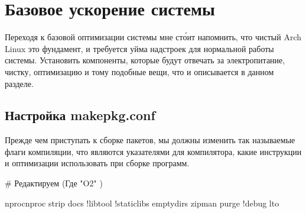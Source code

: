 \documentclass[letterpaper,10pt,russian,openany]{sphinxmanual}
\begin{document}
\sphinxstepscope


\chapter{Базовое ускорение системы}
\label{\detokenize{source/generic-system-acceleration:generic-system-acceleration}}\label{\detokenize{source/generic-system-acceleration:id1}}\label{\detokenize{source/generic-system-acceleration::doc}}
\sphinxAtStartPar
Переходя к базовой оптимизации системы мне сто́ит напомнить, что чистый Arch Linux \sphinxhyphen{} это фундамент, и требуется уйма надстроек для нормальной работы системы.
Установить компоненты, которые будут отвечать за электропитание, чистку, оптимизацию и тому подобные вещи, что и описывается в данном разделе.

\ignorespaces 

\section{Настройка makepkg.conf}
\label{\detokenize{source/generic-system-acceleration:makepkg-conf}}\label{\detokenize{source/generic-system-acceleration:index-0}}\label{\detokenize{source/generic-system-acceleration:id2}}
\sphinxAtStartPar
Прежде чем приступать к сборке пакетов, мы должны изменить так называемые флаги компиляции,
что являются указателями для компилятора, какие инструкции и оптимизации использовать при сборке программ.

\sphinxAtStartPar
{} \# Редактируем (Где "\sphinxhyphen{}O2" \sphinxhyphen{} )

\sphinxAtStartPar
{}

\begin{sphinxVerbatim}[commandchars=\\\{\}]
nprocnproc
strip docs !libtool !staticlibs emptydirs zipman purge !debug lto
\end{sphinxVerbatim}
\end{document}
